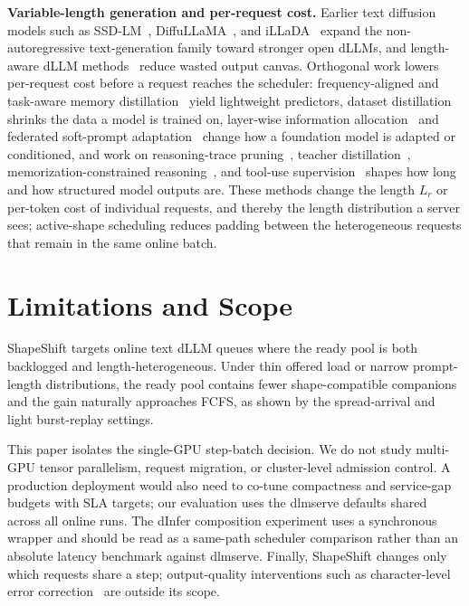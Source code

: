 \documentclass[a4paper]{llncs}
\begin{document}
\textbf{Variable-length generation and per-request cost.} Earlier text diffusion models such as SSD-LM~\cite{ssdlm2022}, DiffuLLaMA~\cite{diffullama2024}, and iLLaDA~\cite{illada2026} expand the non-autoregressive text-generation family toward stronger open dLLMs, and length-aware dLLM methods~\cite{nativelength2026} reduce wasted output canvas. Orthogonal work lowers per-request cost before a request reaches the scheduler: frequency-aligned and task-aware memory distillation~\cite{li2025frequency,li2026tam} yield lightweight predictors, dataset distillation~\cite{li2025ddtime} shrinks the data a model is trained on, layer-wise information allocation~\cite{li2026rethinking} and federated soft-prompt adaptation~\cite{xiao2026prototype} change how a foundation model is adapted or conditioned, and work on reasoning-trace pruning~\cite{jiang2025drp}, teacher distillation~\cite{zhang2025find}, memorization-constrained reasoning~\cite{jiang2026beyond}, and tool-use supervision~\cite{xu2025learning,jiang2026scribe} shapes how long and how structured model outputs are. These methods change the length $L_r$ or per-token cost of individual requests, and thereby the length distribution a server sees; active-shape scheduling reduces padding between the heterogeneous requests that remain in the same online batch.

\section{Limitations and Scope}

ShapeShift targets online text dLLM queues where the ready pool is both backlogged and length-heterogeneous. Under thin offered load or narrow prompt-length distributions, the ready pool contains fewer shape-compatible companions and the gain naturally approaches FCFS, as shown by the spread-arrival and light burst-replay settings.

This paper isolates the single-GPU step-batch decision. We do not study multi-GPU tensor parallelism, request migration, or cluster-level admission control. A production deployment would also need to co-tune compactness and service-gap budgets with SLA targets; our evaluation uses the dlmserve defaults shared across all online runs. The dInfer composition experiment uses a synchronous wrapper and should be read as a same-path scheduler comparison rather than an absolute latency benchmark against dlmserve. Finally, ShapeShift changes only which requests share a step; output-quality interventions such as character-level error correction~\cite{lin2026cec} are outside its scope.
\end{document}
